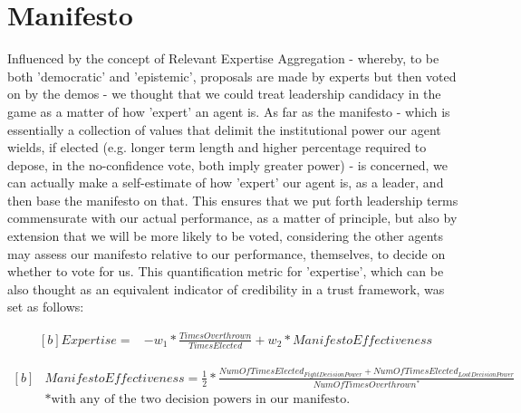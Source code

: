 \section{Manifesto}

Influenced by the concept of Relevant Expertise Aggregation - whereby, to be both 'democratic' and 'epistemic', proposals are made by experts but then voted on by the demos - we thought that we could treat leadership candidacy in the game as a matter of how 'expert' an agent is. As far as the manifesto - which is essentially a collection of values that delimit the institutional power our agent wields, if elected (e.g. longer term length and higher percentage required to depose, in the no-confidence vote, both imply greater power) - is concerned, we can actually make a self-estimate of how 'expert' our agent is, as a leader, and then base the manifesto on that. This ensures that we put forth leadership terms commensurate with our actual performance, as a matter of principle, but also by extension that we will be more likely to be voted, considering the other agents may assess our manifesto relative to our performance, themselves, to decide on whether to vote for us. This quantification metric for 'expertise', which can be also thought as an equivalent indicator of credibility in a trust framework, was set as follows:

\begin{equation}
\begin{aligned}[b]
Expertise =& - w_1 * \frac{TimesOverthrown}{TimesElected} + w_2 * Mani\!f\!estoE\!f\!f\!ectiveness
\end{aligned}
\end{equation}

\begin{equation}
\begin{aligned}[b]
&Mani\!f\!estoE\!f\!f\!ectiveness = \frac{1}{2} * \frac{NumOfTimesElected_{FightDecisionPower} + NumOfTimesElected_{LootDecisionPower}}{NumOfTimesOverthrown^*}\\ &*\text{with any of the two decision powers in our manifesto.}
\end{aligned}
\end{equation}

